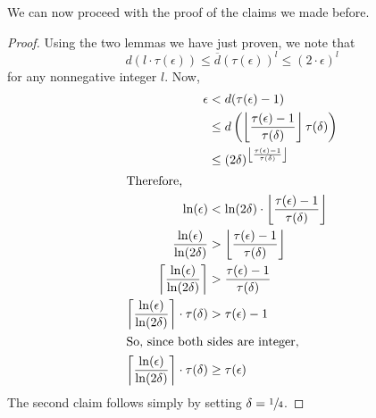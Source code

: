 		We can now proceed with the proof of the claims we made before.
		\begin{proof}
			Using the two lemmas we have just proven, we note that
			$$
				d(l\cdot\tau(\epsilon)) \leq \overline d(\tau(\epsilon))^l 
				\leq (2\cdot\epsilon)^l
			$$
			for any nonnegative integer $l$. Now,
			\begin{align*}
				\epsilon &< d(\tau(\epsilon) - 1) \\
				&\leq d\left(\left\lfloor\frac{\tau(\epsilon)-1}{\tau(\delta)}
				\right\rfloor\tau(\delta)\right)\\
				&\leq (2\delta)^{\left\lfloor\frac{\tau(\epsilon)-1}
				{\tau(\delta)}\right\rfloor} \\
			\intertext{Therefore,}
				\ln(\epsilon) &< \ln(2\delta) \cdot \left\lfloor\frac{\tau
				(\epsilon)-1}{\tau(\delta)}\right\rfloor \\
				\frac{\ln(\epsilon)}{\ln(2\delta)} &> \left\lfloor\frac{\tau
				(\epsilon)-1}{\tau(\delta)}\right\rfloor \\
				\left\lceil\frac{\ln(\epsilon)}{\ln(2\delta)} \right\rceil&> 
				\frac{\tau(\epsilon)-1}{\tau(\delta)} \\
				\left\lceil\frac{\ln(\epsilon)}{\ln(2\delta)} \right\rceil 
				\cdot \tau(\delta) &> \tau(\epsilon)-1 \\
			\intertext{So, since both sides are integer,}
				\left\lceil\frac{\ln(\epsilon)}{\ln(2\delta)} \right\rceil 
				\cdot \tau(\delta) &\geq \tau(\epsilon) 
			\end{align*}
			The second claim follows simply by setting $\delta=\sfrac{1}{4}$.
		\end{proof}

